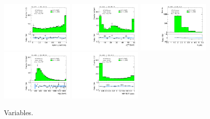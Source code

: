 \begin{figure}[tp]
  \includegraphics[width=0.32\textwidth]{figures/analysis/vbf-MCXSR/lep-eta-centrality}
  \includegraphics[width=0.32\textwidth]{figures/analysis/vbf-MCXSR/system-pt}
  \includegraphics[width=0.32\textwidth]{figures/analysis/vbf-MCXSR/n-jets30}
  \includegraphics[width=0.32\textwidth]{figures/analysis/vbf-MCXSR/dijet-m-high}
  \includegraphics[width=0.32\textwidth]{figures/analysis/vbf-MCXSR/BDTEve-VBF}
  \caption{Variables.}
  \label{fig:backgrounds-MCXSR-jets}
\end{figure}


